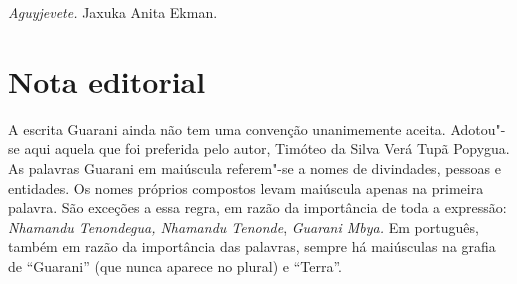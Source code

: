 \medskip{} 

\hfill \emph{Aguyjevete.}
Jaxuka\tabularnewline
Anita Ekman.

 

 

\section{Nota editorial}

A escrita Guarani ainda não tem uma convenção unanimemente aceita.
Adotou"-se aqui aquela que foi preferida pelo autor, Timóteo da Silva
Verá Tupã Popygua. As palavras Guarani em maiúscula referem"-se a nomes
de divindades, pessoas e entidades. Os nomes próprios compostos levam
maiúscula apenas na primeira palavra. São exceções a essa regra, em
razão da importância de toda a expressão: \emph{Nhamandu Tenondegua,
Nhamandu Tenonde}, \emph{Guarani Mbya.} Em português, também em razão da
importância das palavras, sempre há maiúsculas na grafia de ``Guarani''
(que nunca aparece no plural) e ``Terra''.
